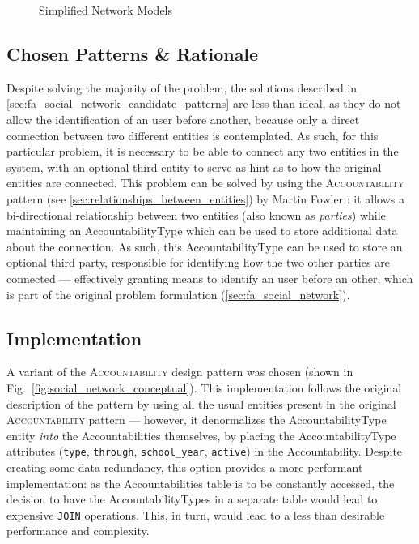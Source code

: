 \begin{figure}[H]
  \centering
  \hspace{20mm}
  \caption{Simplified Network Models}
  \label{fig:simplified_network_models}
\end{figure}

\subsection{Chosen Patterns \& Rationale}\label{sec:fa_social_network_chosen_patterns_rationale}

Despite solving the majority of the problem, the solutions described in \ref{sec:fa_social_network_candidate_patterns} are less than ideal, as they do not allow the identification of an user before another, because only a direct connection between two different entities is contemplated. As such, for this particular problem, it is necessary to be able to connect any two entities in the system, with an optional third entity to serve as hint as to how the original entities are connected. This problem can be solved by using the \textsc{Accountability} pattern (see \ref{sec:relationships_between_entities}) by Martin Fowler \cite{fowler_accountability}: it allows a bi-directional relationship between two entities (also known as \emph{parties}) while maintaining an AccountabilityType which can be used to store additional data about the connection. As such, this AccountabilityType can be used to store an optional third party, responsible for identifying how the two other parties are connected --- effectively granting means to identify an user before an other, which is part of the original problem formulation (\ref{sec:fa_social_network}).

\subsection{Implementation}\label{sec:fa_social_network_implementation}

A variant of the \textsc{Accountability} design pattern was chosen (shown in Fig.~\ref{fig:social_network_conceptual}). This implementation follows the original description of the pattern by using all the usual entities present in the original \textsc{Accountability} pattern \cite{fowler_accountability} --- however, it denormalizes the AccountabilityType entity \emph{into} the Accountabilities themselves, by placing the AccountabilityType attributes (\verb!type!, \verb!through!, \verb!school_year!, \verb!active!) in the Accountability. Despite creating some data redundancy, this option provides a more performant implementation: as the Accountabilities table is to be constantly accessed, the decision to have the AccountabilityTypes in a separate table would lead to expensive \verb!JOIN! operations. This, in turn, would lead to a less than desirable performance and complexity.

